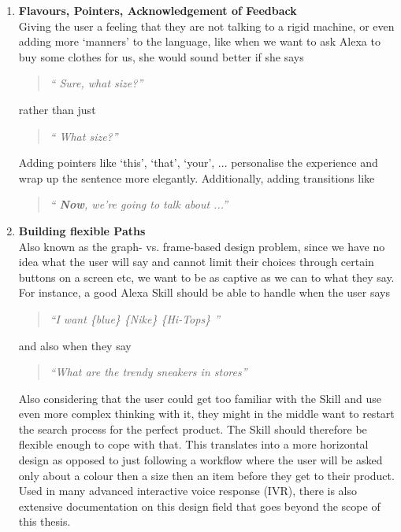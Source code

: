 \begin{enumerate}
\item \textbf{Flavours, Pointers, Acknowledgement of Feedback}\\
Giving the user a feeling that they are not talking to a rigid machine, or even adding more `manners' to the language, like when we want to ask Alexa to buy some clothes for us, she would sound better if she says 


\begin{quotation}
	\flushright
	\textit{	`` Sure, what size?''}
\end{quotation}


rather than just 


\begin{quotation}
	\flushright
	\textit{	`` What size?''}
\end{quotation}



Adding pointers like `this', `that', `your', ... personalise the experience and wrap up the sentence more elegantly. Additionally, adding transitions like 
\begin{quotation}
	\flushright
	\textit{	`` \textbf{Now}, we're going to talk about ...''}
\end{quotation}



\item \textbf{Building flexible Paths}\\
Also known as the graph- vs. frame-based design problem, since we have no idea what the user will say and cannot limit their choices through certain buttons on a screen etc, we want to be as captive as we can to what they say. For instance, a good Alexa Skill should be able to handle when the user says

\begin{quotation}

	\textit{	``I want \{blue\} \{Nike\} \{Hi-Tops\} ''}
\end{quotation}

and also when they say 

\begin{quotation}

	\textit{	``What are the trendy sneakers in stores''}
\end{quotation}

Also considering that the user could get too familiar with the Skill and use even more complex thinking with it, they might in the middle want to restart the search process for the perfect product. The Skill should therefore be flexible enough to cope with that. This translates into a more horizontal design as opposed to just following a workflow where the user will be asked only about a colour then a size then an item before they get to their product. Used in many advanced interactive voice response (IVR), there is also extensive documentation on this design field that goes beyond the scope of this thesis.




\end{enumerate}
